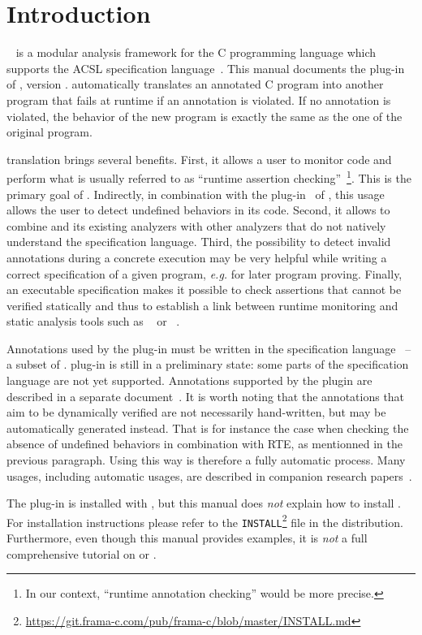 \chapter{Introduction}

\framac~\cite{userman,fac15} is a modular analysis framework for the C
programming language which supports the ACSL specification
language~\cite{acsl}. This manual documents the \eacsl plug-in of \framac,
version \framacversion. \eacsl
automatically translates an annotated C program into another program that fails
at runtime if an annotation is violated. If no annotation is violated, the
behavior of the new program is exactly the same as the one of the original
program.

\eacsl translation brings several benefits. First, it allows a user to monitor
\C code and perform what is usually referred to as ``runtime assertion
checking''~\cite{runtime-assertion-checking}\footnote{In our context, ``runtime
  annotation checking'' would be more precise.}. This is the primary goal of
\eacsl. Indirectly, in combination with the \rte plug-in~\cite{rte} of \framac,
this
usage allows the user to detect undefined behaviors in its \C code. Second, it
allows to combine \framac and its existing analyzers with other \C analyzers
that do not natively understand the \acsl specification language. Third, the
possibility to detect invalid annotations during a concrete execution may be
very helpful while writing a correct specification of a given program,
\emph{e.g.} for later program proving.  Finally, an executable specification
makes it possible to check assertions that cannot be verified statically and
thus to establish a link between runtime monitoring and static analysis tools
such as \Eva~\cite{eva} or \wpplugin~\cite{wp}.

Annotations used by the plug-in must be written in the \eacsl specification
language~\cite{eacsl,sac13} -- a subset of \acsl. \eacsl plug-in is still in a
preliminary state: some parts of the \eacsl specification language are not yet
supported. Annotations supported by the plugin are described in a separate
document~\cite{eacsl-implem}. It is worth noting that the annotations that aim
to be dynamically verified are not necessarily hand-written, but may be
automatically generated instead. That is for instance the case when checking the
absence of undefined behaviors in combination with RTE, as mentionned in the
previous paragraph. Using \eacsl this way is therefore a fully automatic
process. Many usages, including automatic usages, are described in companion
research papers~\cite{rv13tutorial,rvcubes17tool,signoles18hdr}.

The \eacsl plug-in is installed with \framac, but this manual does \emph{not}
explain how to install \framac.  For installation instructions please refer to
the \texttt{INSTALL}\footnote{
  \url{https://git.frama-c.com/pub/frama-c/blob/master/INSTALL.md}}
file in the \framac distribution.  Furthermore, even though
this manual provides examples, it is \emph{not} a full comprehensive tutorial on
\framac or \eacsl.
